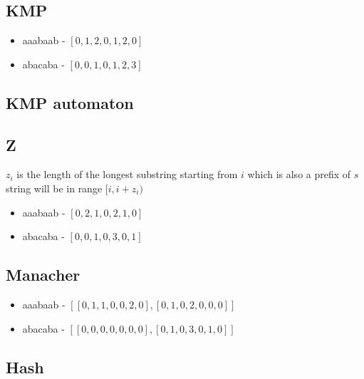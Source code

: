 
\subsection{KMP }

\begin{itemize}[noitemsep]
  \item aaabaab - $[0, 1, 2, 0, 1, 2, 0]$
  \item abacaba - $[0, 0, 1, 0, 1, 2, 3]$
\end{itemize}

\subsection{KMP automaton }


\subsection{Z }

$z_i$ is the length of the longest substring starting from $i$ which is also a prefix of $s$ string will be in range $[i, i + z_i)$

\begin{itemize}[noitemsep]
  \item aaabaab - $[0, 2, 1, 0, 2, 1, 0]$
  \item abacaba - $[0, 0, 1, 0, 3, 0, 1]$
\end{itemize}

\subsection{Manacher }

\begin{itemize}[noitemsep]
  \item aaabaab - $[[0, 1, 1, 0, 0, 2, 0], [0, 1, 0, 2, 0, 0, 0]]$
  \item abacaba - $[[0, 0, 0, 0, 0, 0, 0], [0, 1, 0, 3, 0, 1, 0]]$
\end{itemize}

\subsection{Hash }


